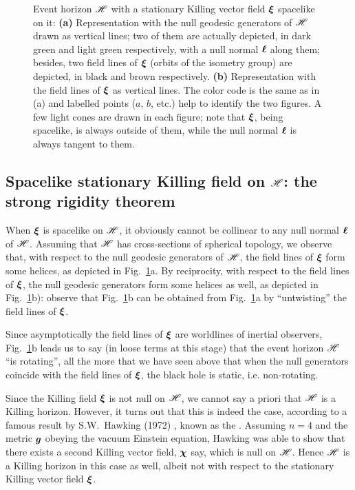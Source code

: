 \begin{figure}
\caption[]{\label{f:sta:rot_horizon} \footnotesize
Event horizon $\mathscr{H}$ with a stationary Killing vector field $\bm{\xi}$ spacelike
on it:
\textbf{(a)} Representation with the null geodesic generators of $\mathscr{H}$ drawn as vertical
lines; two of them are actually depicted, in dark green and light green
respectively, with a null normal $\bm{\ell}$ along them; besides,
two field lines of $\bm{\xi}$
(orbits of the isometry group) are depicted, in black and brown
respectively.
\textbf{(b)} Representation with the field lines of $\bm{\xi}$ as vertical lines.
The color code is the same as in (a) and
labelled points ($a$, $b$, etc.) help to identify
the two figures. A few light cones are drawn in each figure; note that $\bm{\xi}$,
being spacelike,
is always outside of them,
while the null normal $\bm{\ell}$ is always tangent to them. }
\end{figure}


\subsection{Spacelike stationary Killing field on $\mathscr{H}$: the strong rigidity theorem}
\label{s:sta:strong_rigidity}

When $\bm{\xi}$ is spacelike on $\mathscr{H}$, it obviously cannot be collinear to
any null normal $\bm{\ell}$ of $\mathscr{H}$.
Assuming that $\mathscr{H}$ has cross-sections of spherical topology, we observe
that, with respect to the null geodesic generators of $\mathscr{H}$, the field lines of $\bm{\xi}$
form some helices, as depicted in Fig.~\ref{f:sta:rot_horizon}a. By reciprocity,
with respect to the field lines of $\bm{\xi}$,
the null geodesic generators form some helices as well, as depicted in
Fig.~\ref{f:sta:rot_horizon}b):
observe that Fig.~\ref{f:sta:rot_horizon}b can be obtained from Fig.~\ref{f:sta:rot_horizon}a
by ``untwisting'' the field lines of $\bm{\xi}$.

Since asymptotically the field lines of $\bm{\xi}$ are worldlines of inertial observers,
Fig.~\ref{f:sta:rot_horizon}b leads us to say
(in loose terms at this stage) that the event horizon $\mathscr{H}$
``is rotating'', all the more that we have seen above that when the null
generators coincide with the field lines of $\bm{\xi}$, the black hole is static, i.e. non-rotating.

Since the Killing field $\bm{\xi}$ is not null on $\mathscr{H}$, we cannot say a priori
that $\mathscr{H}$ is a Killing horizon. However, it turns out
that this is indeed the case, according to a famous result by
S.W.~Hawking (1972)
\cite{Hawki72,HawkiE73}, known as the
.
Assuming $n=4$ and the metric $\bm{g}$ obeying the vacuum Einstein equation,
Hawking was able to show that there exists a second Killing vector field,
$\bm{\chi}$ say, which is null on $\mathscr{H}$. Hence $\mathscr{H}$ is a Killing horizon
in this case as well, albeit not with respect to the
stationary Killing vector field $\bm{\xi}$.

